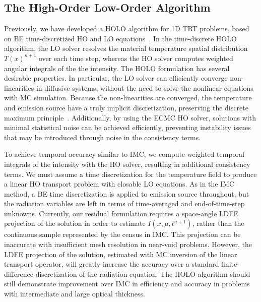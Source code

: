 \documentclass{anstrans}
\begin{document}
\subsection{The High-Order Low-Order Algorithm}

Previously, we have developed a HOLO algorithm for 1D TRT problems, based on BE time-discretized
HO and LO equations~\cite{bolding_nse}.
In the time-discrete HOLO algorithm, the LO solver resolves the material
temperature spatial distribution $T(x)^{n+1}$ over each time step, whereas the HO solver computes weighted
angular integrals of the the intensity.  The HOLO formulation has several desirable
properties.  In particular,  the LO solver can efficiently converge non-linearities in diffusive
systems, without the need to solve the nonlinear equations with MC simulation.
Because the non-linearities are converged, the temperature and emission source
have a truly implicit discretization, preserving the discrete maximum principle~\cite{morel_mpv}.
Additionally, by using the ECMC HO solver, solutions with minimal statistical noise can be achieved
efficiently, preventing instability issues that may be introduced through noise in the consistency terms.

To achieve temporal accuracy similar to IMC, we compute weighted temporal integrals of the
intensity with the HO solver, resulting in additional consistency terms.
We must assume a time discretization for the temperature field to produce a linear HO transport problem
with closable LO equations.  As in the IMC method, a BE time discretization is applied to
emission source throughout, but the radiation variables are left in terms of time-averaged and
end-of-time-step unknowns.   Currently, our residual
formulation requires a space-angle LDFE projection of the solution in order to estimate
$I(x,\mu,t^{n+1})$, rather than the continuous sample represented by the census in IMC.
This projection can be inaccurate with insufficient mesh resolution in near-void problems.
However, the LDFE projection of the solution, estimated with MC inversion of the linear transport operator,
will greatly increase the accuracy over a standard finite-difference
discretization of the radiation equation.  The HOLO algorithm should still demonstrate improvement over IMC in efficiency and
accuracy in problems with intermediate and large optical thickness. 
\end{document}
